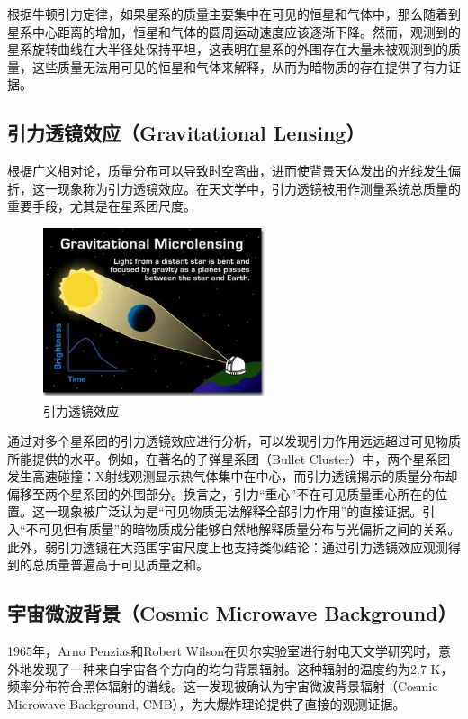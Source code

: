 根据牛顿引力定律，如果星系的质量主要集中在可见的恒星和气体中，那么随着到星系中心距离的增加，恒星和气体的圆周运动速度应该逐渐下降。然而，观测到的星系旋转曲线在大半径处保持平坦，这表明在星系的外围存在大量未被观测到的质量，这些质量无法用可见的恒星和气体来解释，从而为暗物质的存在提供了有力证据。

\subsection{引力透镜效应（Gravitational Lensing）}

根据广义相对论，质量分布可以导致时空弯曲，进而使背景天体发出的光线发生偏折，这一现象称为引力透镜效应。在天文学中，引力透镜被用作测量系统总质量的重要手段，尤其是在星系团尺度。

\begin{figure}[!htbp]
    \centering    
    \includegraphics[height=5cm]{Img/2-2.jpg}
    \caption{引力透镜效应 }
    \label{2-2}
\end{figure}

通过对多个星系团的引力透镜效应进行分析，可以发现引力作用远远超过可见物质所能提供的水平。例如，在著名的子弹星系团（Bullet Cluster）中，两个星系团发生高速碰撞：X射线观测显示热气体集中在中心，而引力透镜揭示的质量分布却偏移至两个星系团的外围部分。换言之，引力“重心”不在可见质量重心所在的位置。这一现象被广泛认为是“可见物质无法解释全部引力作用”的直接证据。引入“不可见但有质量”的暗物质成分能够自然地解释质量分布与光偏折之间的关系。此外，弱引力透镜在大范围宇宙尺度上也支持类似结论：通过引力透镜效应观测得到的总质量普遍高于可见质量之和。

\subsection{宇宙微波背景（Cosmic Microwave Background）}

1965年，Arno Penzias和Robert Wilson在贝尔实验室进行射电天文学研究时，意外地发现了一种来自宇宙各个方向的均匀背景辐射。这种辐射的温度约为2.7 K，频率分布符合黑体辐射的谱线。这一发现被确认为宇宙微波背景辐射（Cosmic Microwave Background, CMB），为大爆炸理论提供了直接的观测证据。


